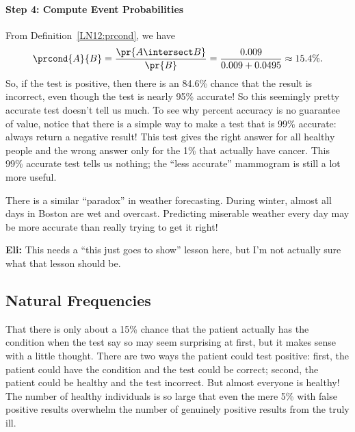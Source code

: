 \paragraph{Step 4: Compute Event Probabilities}

From Definition~\ref{LN12:prcond}, we have
\begin{equation*}
\prcond{A}{B}	= \frac{\pr{A \intersect B}}{\pr{B}} %
		= \frac{0.009}{0.009 + 0.0495} %
		\approx 15.4\%.
\end{equation*}
So, if the test is positive, then there is an 84.6\% chance that the
result is incorrect, even though the test is nearly 95\% accurate!  So
this seemingly pretty accurate test doesn't tell us much.  To see why
percent accuracy is no guarantee of value, notice that there is a
simple way to make a test that is 99\% accurate: always return a
negative result!  This test gives the right answer for all healthy
people and the wrong answer only for the 1\% that actually have
cancer.  This 99\% accurate test tells us nothing; the ``less
accurate'' mammogram is still a lot more useful.


\begin{editingnotes}
There is a similar ``paradox'' in weather forecasting.  During winter,
almost all days in Boston are wet and overcast.  Predicting miserable
weather every day may be more accurate than really trying to get it
right!
\end{editingnotes}


\begin{editingnotes}
\textbf{Eli:} This needs a ``this just goes to show'' lesson here, but I'm not
actually sure what that lesson should be.
\end{editingnotes}

\subsection{Natural Frequencies}

That there is only about a 15\% chance that the patient actually has
the condition when the test say so may seem surprising at first, but
it makes sense with a little thought.  There are two ways the patient
could test positive: first, the patient could have the condition and
the test could be correct; second, the patient could be healthy
and the test incorrect.  But almost everyone is healthy!  The number
of healthy individuals is so large that even the mere 5\% with false
positive results overwhelm the number of genuinely positive results
from the truly ill.

